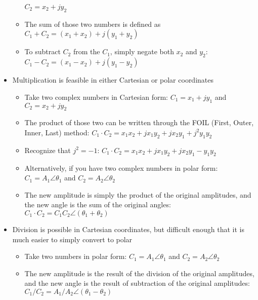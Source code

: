 \begin{itemize}
\begin{itemize}
    $C_2=x_2+jy_2$
  \item The sum of those two numbers is defined as
    $C_1+C_2=(x_1+x_2)+j(y_1+y_2)$
  \item To subtract $C_2$ from the $C_1$, simply negate both $x_2$ and $y_2$:
    $C_1-C_2=(x_1-x_2)+j(y_1-y_2)$
  \end{itemize}
\item Multiplication is feasible in either Cartesian or polar coordinates
  \begin{itemize}
  \item Take two complex numbers in Cartesian form: $C_1=x_1+jy_1$ and
    $C_2=x_2+jy_2$
  \item The product of those two can be written through the FOIL (First, Outer, Inner, Last) method: $C_1\cdot C_2 = x_1x_2 + jx_1y_2 + jx_2y_1 + j^2y_1y_2$
  \item Recognize that $j^2=-1$:
    $C_1\cdot C_2 = x_1x_2 + jx_1y_2 + jx_2y_1 - y_1y_2$
  \item Alternatively, if you have two complex numbers in polar form: $C_1=A_1\angle\theta_1$ and $C_2=A_2\angle\theta_2$
  \item The new amplitude is simply the product of the original amplitudes, and the new angle is the sum of the original angles:
    $C_1\cdot C_2 = C_1C_2\angle(\theta_1+\theta_2)$
  \end{itemize}
\item Division is possible in Cartesian coordinates, but difficult enough that it is much easier to simply convert to polar
  \begin{itemize}
  \item Take two numbers in polar form: $C_1=A_1\angle\theta_1$ and $C_2=A_2\angle\theta_2$
  \item The new amplitude is the result of the division of the original amplitudes, and the new angle is the result of subtraction of the original amplitudes: $C_1/C_2 = A_1/A_2 \angle(\theta_1 - \theta_2)$
  \end{itemize}
\end{itemize}
